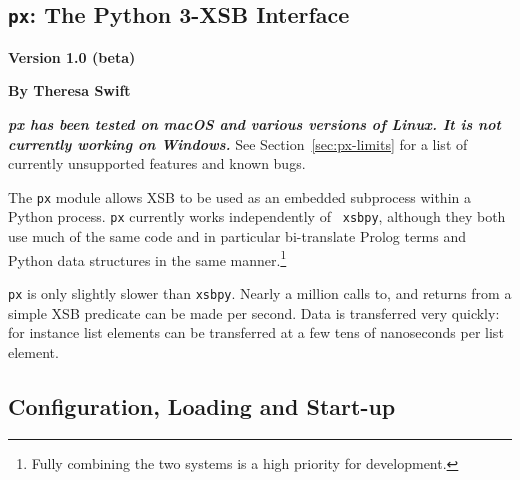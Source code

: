 
\newcommand{\pxversion}{Version 1.0 (beta)}
\newcommand{\px}{{\tt px}}

\begin{center}
\chapter{\px{}: The Python 3-XSB Interface} \label{chap:px}
\end{center}

\vspace*{-.30in} 
\begin{center}
{\Large {\bf  \pxversion}}
\end{center}

\begin{center}
  {\Large {\bf By Theresa Swift}}
\end{center}

\noindent
    {\large {\bf {\em px has been tested on macOS and various versions of
        Linux. It is not currently working on Windows.}} See
      Section~\ref{sec:px-limits} for a list of currently unsupported
      features and known bugs.}

The \px{} module allows XSB to be used as an embedded subprocess
within a Python process.  \px{} currently works independently of {\tt
  xsbpy}, although they both use much of the same code and in
particular bi-translate Prolog terms and Python data structures in the
same manner.\footnote{Fully combining the two systems is a high
  priority for development.}

\px{} is only slightly slower than {\tt xsbpy}.  Nearly a million
calls to, and returns from a simple XSB predicate can be made per
second.  Data is transferred very quickly: for instance list elements
can be transferred at a few tens of nanoseconds per list element.

\section{Configuration, Loading and Start-up} \label{px:config}


